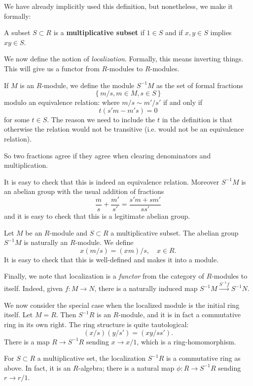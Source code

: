 We have already implicitly used this definition, but nonetheless, we make it
formally:
\begin{definition} \label{multset}
A subset $S \subset R$ is a \textbf{multiplicative subset} if $1 \in S$ and
if $x,y \in S$ implies $xy \in S$.
\end{definition}

We now define the notion of \emph{localization}. Formally, this means
inverting things.
This will give us a functor from $R$-modules to $R$-modules.

\begin{definition}
If $M$ is an $R$-module, we define the module $S^{-1}M$ as the set of formal
fractions
\[  \left\{m/s, m \in M, s \in S\right\}  \]
modulo an equivalence relation: where $m/s \sim m'/s'$ if and only if
\[ t( s'm -   m's ) = 0  \]
for some $t \in S$.  The reason we need to include the $t$ in the definition
is that otherwise the
 relation would not be transitive (i.e. would not be an
equivalence relation).
\end{definition}
So two fractions agree if they agree when clearing denominators and
multiplication.

It is easy to check that this is indeed an equivalence relation. Moreover
$S^{-1}M$ is an abelian group with the usual addition of fractions
\[ \frac{m}{s}+\frac{m'}{s'} = \frac{s'm + sm'}{ss'}  \]
and it is easy to check that this is a legitimate abelian group.

\begin{definition}
Let $M$ be an $R$-module and $S \subset R$ a multiplicative subset.
The abelian group $S^{-1}M$ is naturally an $R$-module.  We define
\[ x(m/s) = (xm)/s, \quad x \in R.  \]
It is easy to check that this is well-defined and makes it into a module.

Finally, we note that localization is a \emph{functor} from the category of
$R$-modules to itself. Indeed, given $f: M \to N$, there is a naturally
induced map $S^{-1}M \stackrel{S^{-1}f}{\to} S^{-1}N$.

\end{definition}

We now consider the special case when the localized module is the initial ring
itself.
Let $M = R$.  Then $S^{-1}R$ is an $R$-module, and it is in fact a commutative
ring in its own right. The ring structure is quite tautological:
\[ (x/s)(y/s') = (xy/ss').  \]
There is a map $R \to S^{-1}R$ sending $x \to x/1$, which is a
ring-homomorphism.

\begin{definition}
For $S \subset R$ a multiplicative set, the localization $S^{-1}R$ is a
commutative ring as above. In fact, it is an $R$-algebra; there is a natural
map $\phi: R \to S^{-1}R$ sending $r \to r/1$.
\end{definition}

